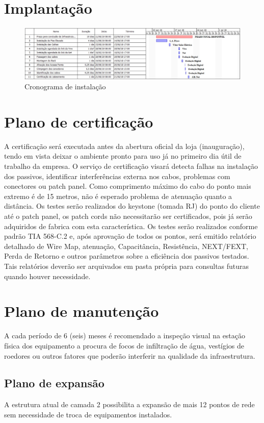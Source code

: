 \documentclass[	DIV=calc,%
							paper=a4,%
							fontsize=12pt,%
							onecolumn]{scrartcl}	 					%
\begin{document}
\section{Implantação}

\begin{figure}[H]
	\centering
	\includegraphics[width=\textwidth]{Cronograma}
	\caption{Cronograma de instalação}
	\label{fig5}
\end{figure}

\section{Plano de certificação}
A certificação será executada antes da abertura oficial da loja (inauguração), tendo em vista deixar o ambiente pronto para uso já no primeiro dia útil de trabalho da empresa. O serviço de certificação visará detecta falhas na instalação dos passivos, identificar interferências externa nos cabos, problemas com conectores ou patch panel.
Como comprimento máximo do cabo do ponto mais extremo é de 15 metros, não é esperado problema de atenuação quanto a distância.
Os testes serão realizados do keystone (tomada RJ) do ponto do cliente até o patch panel, os patch cords não necessitarão ser certificados, pois já serão adquiridos de fabrica com esta característica.
Os testes serão realizados conforme padrão TIA 568-C.2 e, após aprovação de todos os pontos, será emitido relatório detalhado de Wire Map, atenuação, Capacitância, Resistência, NEXT/FEXT, Perda de Retorno e outros parâmetros sobre a eficiência dos passivos testados. Tais relatórios deverão ser arquivados em pasta própria para consultas futuras quando houver necessidade.

\section{Plano de manutenção}
A cada período de 6 (seis) meses é recomendado a inspeção visual na estação física dos equipamento a procura de focos de infiltração de água, vestígios de roedores ou outros fatores que poderão interferir na qualidade da infraestrutura. 


\subsection{Plano de expansão}
A estrutura atual de camada 2 possibilita a expansão de mais 12 pontos de rede sem necessidade de troca de equipamentos instalados.
\end{document}
